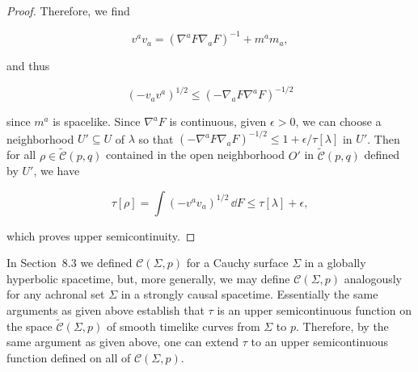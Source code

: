 \begin{proof}
Therefore, we find

\begin{equation}
  v^av_a=(\nabla^aF\nabla_aF)^{-1}+m^am_a ,
  \tag{9.4.7}\label{eq:9.4.7}
\end{equation}

and thus

\begin{equation}
  (-v_av^a)^{1/2}\leq(-\nabla_aF\nabla^aF)^{-1/2}
  \tag{9.4.8}\label{eq:9.4.8}
\end{equation}

since \(m^a\) is spacelike. Since \(\nabla^aF\) is continuous, given
\(\epsilon>0\), we can choose a neighborhood \(U'\subseteq U\) of \(\lambda\) so that
\((-\nabla^aF\nabla_aF)^{-1/2}\leq1+\epsilon/\tau[\lambda]\) in \(U'\). Then for all
\(\rho\in\widetilde{\mathcal C}(p,q)\) contained in the open neighborhood \(O'\) in
\(\widetilde{\mathcal C}(p,q)\) defined by \(U'\), we have

\begin{equation}
  \tau[\rho]=\int(-v^av_a)^{1/2}\,\dd F\leq\tau[\lambda]+\epsilon ,
  \tag{9.4.9}\label{eq:9.4.9}
\end{equation}

which proves upper semicontinuity.
\end{proof}

In Section~8.3 we defined \(\mathcal C(\Sigma,p)\) for a Cauchy surface \(\Sigma\) in a
globally hyperbolic spacetime, but, more generally, we may define
\(\mathcal C(\Sigma,p)\) analogously for any achronal set \(\Sigma\) in a strongly
causal spacetime. Essentially the same arguments as given above establish that
\(\tau\) is an upper semicontinuous function on the space
\(\widetilde{\mathcal C}(\Sigma,p)\) of smooth timelike curves from \(\Sigma\) to \(p\).
Therefore, by the same argument as given above, one can extend \(\tau\) to an upper
semicontinuous function defined on all of \(\mathcal C(\Sigma,p)\).

